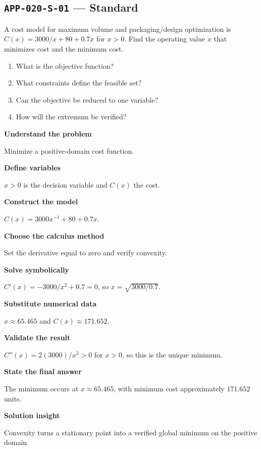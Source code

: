 \documentclass[11pt]{book}
\newcommand{\pid}[1]{\texttt{#1}}
\begin{document}
\subsection*{\pid{APP-020-S-01} — Standard}
\begin{problembox}
A cost model for maximum volume and packaging/design optimization is $C(x)=3000/x+80+0.7x$ for $x>0$. Find the operating value $x$ that minimizes cost and the minimum cost.
\end{problembox}
\begin{promptbox}\begin{enumerate}
\item What is the objective function?
\item What constraints define the feasible set?
\item Can the objective be reduced to one variable?
\item How will the extremum be verified?
\end{enumerate}\end{promptbox}
\begin{solutionbox}
\textbf{Understand the problem}\par Minimize a positive-domain cost function.\par\medskip
\textbf{Define variables}\par $x>0$ is the decision variable and $C(x)$ the cost.\par\medskip
\textbf{Construct the model}\par $C(x)=3000x^{-1}+80+0.7x$.\par\medskip
\textbf{Choose the calculus method}\par Set the derivative equal to zero and verify convexity.\par\medskip
\textbf{Solve symbolically}\par $C'(x)=-3000/x^2+0.7=0$, so $x=\sqrt{3000/0.7}$.\par\medskip
\textbf{Substitute numerical data}\par $x\approx 65.465$ and $C(x)\approx 171.652$.\par\medskip
\textbf{Validate the result}\par $C''(x)=2(3000)/x^3>0$ for $x>0$, so this is the unique minimum.\par\medskip
\textbf{State the final answer}\par The minimum occurs at $x\approx 65.465$, with minimum cost approximately $171.652$ units.\par\medskip
\textbf{Solution insight}\par Convexity turns a stationary point into a verified global minimum on the positive domain.\par\medskip
\end{solutionbox}
\end{document}
